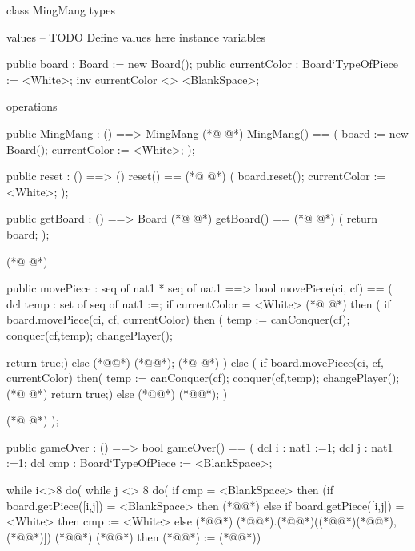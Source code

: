 \begin{vdmpp}[breaklines=true]
class MingMang
types


values
-- TODO Define values here
instance variables

 public board : Board := new Board();
 public currentColor : Board`TypeOfPiece := <White>;
 inv currentColor <> <BlankSpace>;

operations

 public MingMang : () ==> MingMang
(*@
\label{MingMang:16}
@*)
 MingMang() ==
 (
  board := new Board();
  currentColor := <White>;
 );
 
 public reset : () ==> ()
 reset() ==
(*@
\label{reset:24}
@*)
 (
  board.reset();
  currentColor := <White>;
 );
 
 public getBoard : () ==> Board
(*@
\label{getBoard:30}
@*)
 getBoard() ==
(*@
\label{movePiece:31}
@*)
 (
  return board;
 );
 
(*@
\label{setBoard:35}
@*)

 
 
 public movePiece : seq of nat1 * seq of nat1 ==> bool
 movePiece(ci, cf) ==
 ( 
   dcl temp : set of seq of nat1 :={}; 
  if currentColor = <White>
(*@
\label{createDestC:43}
@*)
  then 
  (
     if board.movePiece(ci, cf, currentColor) 
     then 
     (
     temp := canConquer(cf);
     conquer(cf,temp);
     changePlayer();
     
     return true;)
     else (*@@*) (*@@*);
(*@
\label{canConquer:54}
@*)
    )  
  else (
    if board.movePiece(ci, cf, currentColor)
    then(
     temp := canConquer(cf);
    conquer(cf,temp);
    changePlayer();
(*@
\label{changePlayer:61}
@*)
    return true;)
    else (*@@*) (*@@*);
     )

(*@
\label{gameOver:65}
@*)
 );
 
 public gameOver : () ==> bool
 gameOver() ==
 (
  dcl i : nat1 :=1;
  dcl j : nat1 :=1;
  dcl cmp : Board`TypeOfPiece := <BlankSpace>;

  while i<>8 do(
  while j <> 8 do(
    if cmp = <BlankSpace>
   then 
   (if board.getPiece([i,j]) = <BlankSpace>
   then (*@@*)
   else if board.getPiece([i,j]) = <White>
   then cmp := <White>
   else (*@@*) (*@@*).(*@@*)((*@\vdmnotcovered{[}@*)(*@@*),(*@@*)]) (*@\vdmnotcovered{=}@*) (*@@*)
   then (*@@*) := (*@@*))


\end{vdmpp}
